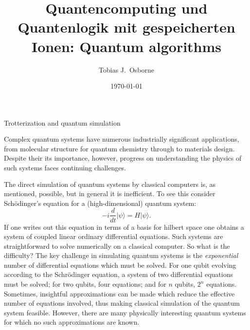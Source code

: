 \documentclass[12pt,oneside]{amsart}
\title[Quantencomputing und Quantenlogik mit gespeicherten Ionen]{Quantencomputing und Quantenlogik mit gespeicherten Ionen: Quantum algorithms}
\author{Tobias J.\ Osborne}
\date{\today}                                           %
\makeatletter
\def\section{\@startsection{section}{1}%
  \z@{.7\linespacing\@plus\linespacing}{.5\linespacing}%
  {\color{cgblue}\normalfont\sf\bfseries\large\centering}}
\theoremstyle{plain}%
\theoremstyle{definition}
\theoremstyle{remark}
\makeatother
\begin{document}
\maketitle

\section{Trotterization and quantum simulation}

Complex quantum systems have numerous industrially significant applications, from molecular structure for quantum chemistry through to materials design. Despite their its importance, however, progress on understanding the physics of such systems faces continuing challenges. 

The direct simulation of quantum systems by classical computers is, as mentioned, possible, but in general it is inefficient. To see this consider Schödinger's equation for a (high-dimensional) quantum system:
\begin{equation}\label{eq:se}
  -i\frac{d}{dt}|\psi\rangle = H |\psi\rangle.  
\end{equation} 
If one writes out this equation in terms of a basis for hilbert space one obtains a system of coupled linear ordinary differential equations. Such systems are straightforward to solve numerically on a classical computer. So what is the difficulty? The key challenge in simulating quantum systems is the \emph{exponential} number of
differential equations which must be solved. For one qubit evolving according to the Schrödinger equation, a system of two differential equations must be solved; for two qubits, four equations; and for $n$ qubits, $2^n$ equations. Sometimes, insightful approximations can be made which reduce the effective number of equations involved, thus making classical simulation of the quantum system feasible. However, there are many physically
interesting quantum systems for which no such approximations are known.
\end{document}
